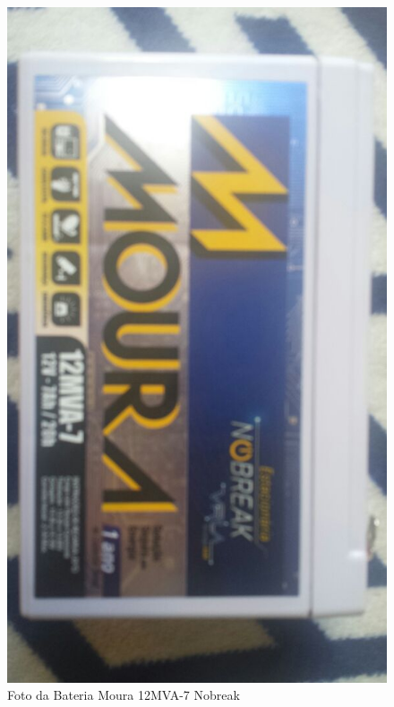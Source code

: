 	\graphicspath{{figuras/}}
	\begin{figure}[h!]
	\centering
	\includegraphics[scale=0.50]{bateria_bike}
	\caption{Foto da Bateria Moura 12MVA-7 Nobreak}
	\label{img:bateria_moura}
	\end{figure}
	
